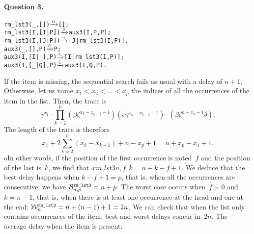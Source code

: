 \medskip

\paragraph{Question 3.}

\begin{alltt}
rm_lst3(_,   []) \(\smashedrightarrow{\alpha}\) [];
rm_lst3(I,[I|P]) \(\smashedrightarrow{\beta}\) aux3(I,P,P);
rm_lst3(I,[J|P]) \(\smashedrightarrow{\gamma}\) [J|rm_lst3(I,P)].
aux3(_,   [],P)  \(\smashedrightarrow{\delta}\) P;
aux3(I,[I|_],P)  \(\smashedrightarrow{\epsilon}\) [I|rm_lst3(I,P)];
aux3(I,[_|Q],P)  \(\smashedrightarrow{\zeta}\) aux3(I,Q,P).
\end{alltt}
If the item is missing, the sequential search fails as usual with a
delay of \(n+1\). Otherwise, let us name \(x_1 < x_2 < \dots < x_p\)
the indices of all the occurrences of the item in the list. Then, the
trace is
\begin{equation*}
\gamma^{x_1} 
\cdot
\prod_{k=2}^{p}(\beta\zeta^{x_k-x_{k-1}-1})(\epsilon\gamma^{x_k-x_{k-1}-1})
\cdot
(\beta\zeta^{n-x_p-1}\delta).
\end{equation*}
The length of the trace is therefore
\begin{equation*}
x_1 + 2\sum_{k=2}^{p}(x_k-x_{k-1}) + n - x_p + 1 = n + x_p - x_1 + 1.
\end{equation*}
oIn other words, if the position of the first occurrence is
noted~\(f\) and the position of the last is~\(k\), we find that
\(\comp{rm\_lst3}{n,f,k} = n + k - f + 1\). We deduce that the best
delay happens when \(k-f+1=p\), that is, when all the occurrences are
consecutive: we have \(\best{rm\_lst3}{n,p} = n + p\). The worst case
occurs when~\({f=0}\) and~\({k=n-1}\), that is, when there is at least
one occurrence at the head and one at the end: \(\worst{rm\_lst3}{n} =
n + (n-1) + 1 = 2n\). We can check that when the list only contains
occurrences of the item, best and worst delays concur in~\(2n\). The
average delay when the item is present:
